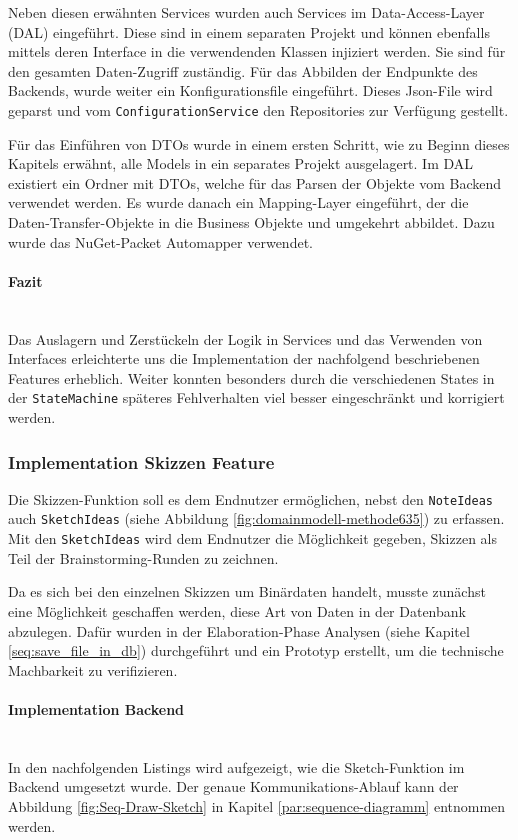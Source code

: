 Neben diesen erwähnten Services wurden auch Services im Data-Access-Layer (DAL) eingeführt. Diese sind in einem separaten Projekt und können ebenfalls mittels deren Interface in die verwendenden Klassen injiziert werden. Sie sind für den gesamten Daten-Zugriff zuständig. Für das Abbilden der Endpunkte des Backends, wurde weiter ein Konfigurationsfile eingeführt. Dieses Json-File wird geparst und vom \texttt{ConfigurationService} den Repositories zur Verfügung gestellt. 

Für das Einführen von DTOs wurde in einem ersten Schritt, wie zu Beginn dieses Kapitels erwähnt, alle Models in ein separates Projekt ausgelagert. Im DAL existiert ein Ordner mit DTOs, welche für das Parsen der Objekte vom Backend verwendet werden. Es wurde danach ein Mapping-Layer eingeführt, der die Daten-Transfer-Objekte in die Business Objekte und umgekehrt abbildet. Dazu wurde das NuGet-Packet Automapper verwendet. 


\paragraph{Fazit}~\\

Das Auslagern und Zerstückeln der Logik in Services und das Verwenden von Interfaces erleichterte uns die Implementation der nachfolgend beschriebenen Features erheblich. Weiter konnten besonders durch die verschiedenen States in der \texttt{StateMachine} späteres Fehlverhalten viel besser eingeschränkt und korrigiert werden. 

\subsubsection{Implementation Skizzen Feature}
Die Skizzen-Funktion soll es dem Endnutzer ermöglichen, nebst den \texttt{NoteIdeas} auch \texttt{SketchIdeas} (siehe Abbildung \ref{fig:domainmodell-methode635}) zu erfassen. Mit den \texttt{SketchIdeas} wird dem Endnutzer die Möglichkeit gegeben, Skizzen als Teil der Brainstorming-Runden zu zeichnen.

Da es sich bei den einzelnen Skizzen um Binärdaten handelt, musste zunächst eine Möglichkeit geschaffen werden, diese Art von Daten in der Datenbank abzulegen. Dafür wurden in der Elaboration-Phase Analysen (siehe Kapitel \ref{seq:save_file_in_db}) durchgeführt und ein Prototyp erstellt, um die technische Machbarkeit zu verifizieren.

\paragraph*{Implementation Backend}~\\
In den nachfolgenden Listings wird aufgezeigt, wie die Sketch-Funktion im Backend umgesetzt wurde.
Der genaue Kommunikations-Ablauf kann der Abbildung \ref{fig:Seq-Draw-Sketch} in Kapitel \ref{par:sequence-diagramm} entnommen werden.

